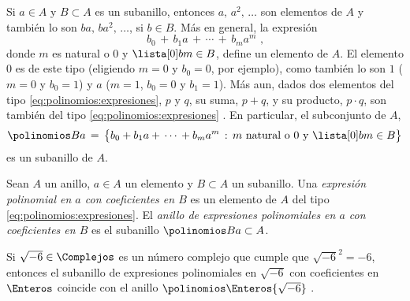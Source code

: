 \begin{obsPolinomios}\label{obs:polinomios:expresiones}
	Si $a\in A$ y $B\subset A$ es un subanillo, entonces
	$a,\,a^2,\,\dots$ son elementos de $A$ y tambi\'en lo son
	$ba,\,ba^2,\,\dots$, si $b\in B$. M\'as en general, la expresi\'on
	\begin{equation}
		\label{eq:polinomios:expresiones}
		b_0\,+\,b_1a\,+\,\cdots\,+\,b_ma^m
		\text{ ,}
	\end{equation}
	donde $m$ es natural o $0$ y $\lista[0] b{m}\in B$,
	define un elemento de $A$.
	El elemento $0$ es de este tipo (eligiendo $m=0$ y $b_0=0$,
	por ejemplo), como tambi\'en lo son $1$ ($m=0$ y $b_0=1$) y
	$a$ ($m=1$, $b_0=0$ y $b_1=1$).
	M\'as aun, dados dos elementos del tipo
	\eqref{eq:polinomios:expresiones}, $p$ y $q$, su suma, $p+q$, y su
	producto, $p\cdot q$, %
	son tambi\'en del tipo \eqref{eq:polinomios:expresiones}
	\quedacomoejercicio.
	En particular, el subconjunto de $A$,
	\begin{displaymath}
		\polinomios B a\,=\,\big\{b_0+b_1a+\,\cdots\,+b_ma^m\,:\,
			m\text{ natural o } 0\text{ y }
			\lista[0] b{m}\in B\big\}
	\end{displaymath}
	es un subanillo de $A$.
\end{obsPolinomios}

\begin{defPolinomios}\label{def:polinomios:expresiones}
	Sean $A$ un anillo, $a\in A$ un elemento y $B\subset A$ un subanillo.
	Una \emph{expresi\'on polinomial en $a$ con coeficientes en $B$}
	es un elemento de $A$ del tipo \eqref{eq:polinomios:expresiones}.
	El \emph{anillo de expresiones polinomiales en $a$ con coeficientes %
	en $B$} es el subanillo $\polinomios B a\subset A$.
\end{defPolinomios}

\begin{ejemPolinomios}\label{ejem:polinomios:expresiones}
	Si $\sqrt{-6}\in\Complejos$ es un n\'umero complejo que cumple que
	$\sqrt{-6}^2=-6$, entonces el subanillo de expresiones polinomiales
	en $\sqrt{-6}$ con coeficientes en $\Enteros$ coincide con el
	anillo $\polinomios \Enteros{\sqrt{-6}}$
	\quedacomoejercicio.
\end{ejemPolinomios}

